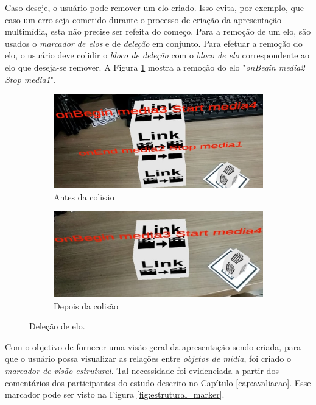 \documentclass[../main.tex]{subfiles}
\begin{document}
Caso deseje, o usuário pode remover um elo criado. Isso evita, por exemplo, que caso um erro seja cometido durante o processo de criação da apresentação multimídia, esta não precise ser refeita do começo. Para a remoção de um elo, são usados o \emph{marcador de elos} e de \emph{deleção} em conjunto. Para efetuar a remoção do elo, o usuário deve colidir o \emph{bloco de deleção} com o \emph{bloco de elo} correspondente ao elo que deseja-se remover. A Figura \ref{fig:elo_delecao} mostra a remoção do elo "\emph{onBegin media2 Stop media1}".

\begin{figure}[!h]
  \begin{subfigure}{0.47\linewidth}
    \includegraphics[width=0.95\linewidth]{IMG/delecao_antes.jpeg}
    \caption{Antes da colisão}
  \end{subfigure}
  \begin{subfigure}{0.51\linewidth}
    \includegraphics[width=0.95\linewidth]{IMG/delecao_depois.jpeg}
    \caption{Depois da colisão}
  \end{subfigure}
\caption{Deleção de elo.}
\label{fig:elo_delecao}
\end{figure}

Com o objetivo de fornecer uma visão geral da apresentação sendo criada, para que o usuário possa visualizar as relações entre \emph{objetos de mídia}, foi criado o \emph{marcador de visão estrutural}. Tal necessidade foi evidenciada a partir dos comentários dos participantes do estudo descrito no Capítulo \ref{cap:avaliacao}. Esse marcador pode ser visto na Figura \ref{fig:estrutural_marker}.
\end{document}
